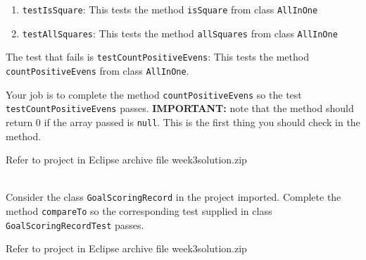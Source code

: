\begin{questions}
\begin{enumerate}
  \item \texttt{testIsSquare}: This tests the method \texttt{isSquare} from class \texttt{AllInOne}
  \item \texttt{testAllSquares}: This tests the method \texttt{allSquares} from class \texttt{AllInOne}
\end{enumerate}

The test that fails is \texttt{testCountPositiveEvens}: This tests the method \texttt{countPositiveEvens} from class \texttt{AllInOne}. 

Your job is to complete the method \texttt{countPositiveEvens} so the test \texttt{testCountPositiveEvens} passes. \textbf{IMPORTANT: } note that the method should return 0 if the array passed is \texttt{null}. This is the first thing you should check in the method. 

\begin{solution}
Refer to project in Eclipse archive file week3solution.zip	
\end{solution}

\vskip 0.5cm

\\

Consider the class \texttt{GoalScoringRecord} in the project imported. Complete the method \texttt{compareTo} so the corresponding test supplied in class \texttt{GoalScoringRecordTest} passes.

\begin{solution}
Refer to project in Eclipse archive file week3solution.zip	
\end{solution}


\end{questions}
